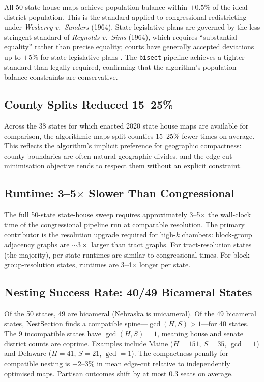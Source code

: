 All 50 state house maps achieve population balance within $\pm 0.5\%$ of
the ideal district population. This is the standard applied to congressional
redistricting under \emph{Wesberry v.\ Sanders} (1964). State legislative
plans are governed by the less stringent standard of \emph{Reynolds v.\ Sims}
(1964), which requires ``substantial equality'' rather than precise equality;
courts have generally accepted deviations up to $\pm 5\%$ for state legislative
plans \citep{karcher1983karcher}. The \texttt{bisect} pipeline achieves a
tighter standard than legally required, confirming that the algorithm's
population-balance constraints are conservative.

\subsection{County Splits Reduced 15--25\%}
\label{sec:findings:splits}

Across the 38 states for which enacted 2020 state house maps are available
for comparison, the algorithmic maps split counties 15--25\% fewer times
on average. This reflects the algorithm's implicit preference for geographic
compactness: county boundaries are often natural geographic divides, and
the edge-cut minimisation objective tends to respect them without an
explicit constraint.

\subsection{Runtime: 3--5$\times$ Slower Than Congressional}
\label{sec:findings:runtime}

The full 50-state state-house sweep requires approximately 3--5$\times$ the
wall-clock time of the congressional pipeline run at comparable resolution.
The primary contributor is the resolution upgrade required for high-$k$ chambers:
block-group adjacency graphs are $\sim\!3\times$ larger than tract graphs.
For tract-resolution states (the majority), per-state runtimes are similar to
congressional times. For block-group-resolution states, runtimes are 3--4$\times$
longer per state.

\subsection{Nesting Success Rate: 40/49 Bicameral States}
\label{sec:findings:nesting}

Of the 50 states, 49 are bicameral (Nebraska is unicameral). Of the 49 bicameral
states, NestSection finds a compatible spine---$\gcd(H,S) > 1$---for 40 states.
The 9 incompatible states have $\gcd(H,S) = 1$, meaning house and senate district
counts are coprime. Examples include Maine ($H=151$, $S=35$, $\gcd=1$) and
Delaware ($H=41$, $S=21$, $\gcd=1$).
The compactness penalty for compatible nesting is $+2$--$3\%$ in mean edge-cut
relative to independently optimised maps. Partisan outcomes shift by at most
$0.3$ seats on average.
